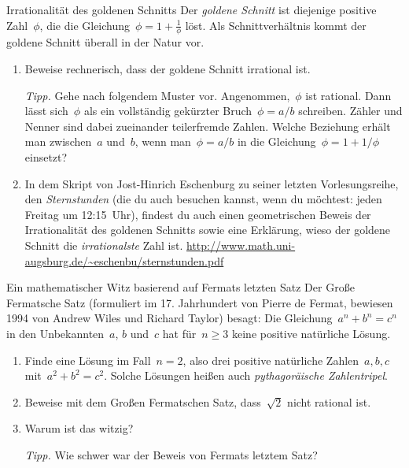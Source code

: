 \documentclass[twoside]{../zirkelblatt1415}
\theoremstyle{definition}
\theoremstyle{plain}
\theoremstyle{remark}
\begin{document}
\begin{aufgabe}{Irrationalität des goldenen Schnitts}
Der \emph{goldene Schnitt} ist diejenige positive Zahl~$\phi$, die die
Gleichung~$\phi = 1 + \frac{1}{\phi}$ löst. Als Schnittverhältnis kommt der goldene
Schnitt überall in der Natur vor.

\begin{enumerate}
\item Beweise rechnerisch, dass der goldene Schnitt irrational ist.

\emph{Tipp.} Gehe nach folgendem Muster vor. Angenommen,~$\phi$ ist rational.
Dann lässt sich~$\phi$ als ein vollständig gekürzter Bruch~$\phi = a/b$
schreiben. Zähler und Nenner sind dabei zueinander teilerfremde Zahlen. Welche
Beziehung erhält man zwischen~$a$ und~$b$, wenn man~$\phi = a/b$ in die
Gleichung~$\phi = 1 + 1/\phi$ einsetzt?

\item In dem Skript von Jost-Hinrich Eschenburg zu seiner letzten
Vorlesungsreihe, den \emph{Sternstunden} (die du auch besuchen kannst, wenn du
möchtest: jeden Freitag um 12:15~Uhr), findest du auch einen geometrischen
Beweis der Irrationalität des goldenen Schnitts sowie eine Erklärung, wieso der
goldene Schnitt die \emph{irrationalste} Zahl ist.
\url{http://www.math.uni-augsburg.de/~eschenbu/sternstunden.pdf}
\end{enumerate}\fixlistspacing
\end{aufgabe}

\begin{aufgabe}{Ein mathematischer Witz basierend auf Fermats letzten Satz}
Der Große Fermatsche Satz (formuliert im 17. Jahrhundert von Pierre de Fermat,
bewiesen 1994 von Andrew Wiles und Richard Taylor) besagt: Die Gleichung~$a^n +
b^n = c^n$ in den Unbekannten~$a$, $b$ und~$c$ hat für~$n \geq 3$ keine
positive natürliche Lösung.
\begin{enumerate}
\item Finde eine Lösung im Fall~$n = 2$, also drei positive natürliche
Zahlen~$a,b,c$ mit~$a^2 + b^2 = c^2$. Solche Lösungen heißen auch
\emph{pythagoräische Zahlentripel}.
\item Beweise mit dem Großen Fermatschen Satz, dass~$\sqrt{2}$ nicht rational
ist.
\item Warum ist das witzig?

\emph{Tipp.} Wie schwer war der Beweis von Fermats letztem Satz?
\end{enumerate}\fixlistspacing
\end{aufgabe}
\end{document}
